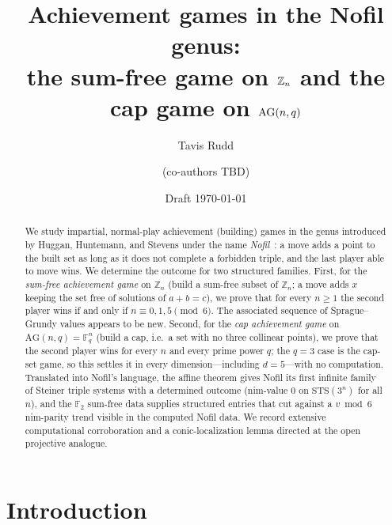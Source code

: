 \documentclass[11pt]{article}
\title{%
  Achievement games in the Nofil genus:\\
  the sum-free game on $\Zn{n}$ and the cap game on $\AG(n,q)$}
\author{%
  Tavis Rudd \and (co-authors TBD)}
\date{Draft \today}
\theoremstyle{plain}
\theoremstyle{definition}
\theoremstyle{remark}
\newcommand{\Zn}[1]{\mathbb{Z}_{#1}}
\newcommand{\Fq}{\mathbb{F}_q}
\newcommand{\AG}{\mathrm{AG}}
\newcommand{\STS}{\mathrm{STS}}
\begin{document}
\maketitle

\begin{abstract}
We study impartial, normal-play achievement (building) games in the genus introduced by
Huggan, Huntemann, and Stevens under the name \emph{Nofil}~\cite{huggan2022nofil}: a move adds
a point to the built set as long as it does not complete a forbidden triple, and the last
player able to move wins. We determine the outcome for two structured families. First, for the
\emph{sum-free achievement game} on $\Zn{n}$ (build a sum-free subset of $\Zn{n}$; a move adds
$x$ keeping the set free of solutions of $a+b=c$), we prove that for every $n \geq 1$ the second
player wins if and only if $n \equiv 0, 1, 5 \pmod 6$. The associated sequence of Sprague--Grundy values
appears to be new. Second, for the \emph{cap achievement game} on $\AG(n,q)=\Fq^n$ (build a cap,
i.e.\ a set with no three collinear points), we prove that the second player wins for every $n$
and every prime power $q$; the $q=3$ case is the cap-set game, so this settles it in every
dimension---including $d=5$---with no computation. Translated into Nofil's language, the affine
theorem gives Nofil its first infinite family of Steiner triple systems with a determined
outcome (nim-value $0$ on $\STS(3^n)$ for all $n$), and the $\mathbb{F}_2$ sum-free data
supplies structured entries that cut against a $v \bmod 6$ nim-parity trend visible in the
computed Nofil data. We record extensive computational corroboration and a conic-localization
lemma directed at the open projective analogue.
\end{abstract}

\section{Introduction}
\label{sec:intro}
\end{document}
